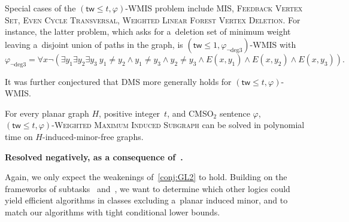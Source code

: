 \documentclass[a4paper,11pt]{article}
\newcommand{\cmsot}{\textsf{CMSO$_2$}\xspace}
\newcommand\tw{\mathsf{tw}}
\newcommand{\smis}{\textsc{MIS}\xspace}
\newtheorem{solved-conj}[conj]{Conjecture}
\newenvironment{solved-conjecture}[1][]
{
  \if\relax\detokenize{#1}\relax\begin{solved-conj}\else\begin{solved-conj}[#1]\fi
  \begin{mdframed}[style=solvedconjecturestyle]
}
{
  \end{mdframed}\end{solved-conj}
}
\begin{document}
Special cases of the $(\tw \leqslant t,\varphi)$-\textsc{WMIS} problem include \smis, \textsc{Feedback Vertex Set}, \textsc{Even Cycle Transversal}, \textsc{Weighted Linear Forest Vertex Deletion}. 
For instance, the latter problem, which asks for a~deletion set of minimum weight leaving a~disjoint union of paths in the graph, is $(\tw \leqslant 1,\varphi_{\neg \text{deg}3})$-\textsc{WMIS} with \[\varphi_{\neg \text{deg}3} = \forall x \neg \left(\exists y_1 \exists y_2 \exists y_3~y_1 \neq y_2 \land y_1 \neq y_3 \land y_2 \neq y_3 \land E(x,y_1) \land E(x,y_2) \land E(x,y_3)\right).\]

It was further conjectured that DMS more generally holds for $(\tw \leqslant t,\varphi)$-\textsc{WMIS}.

\begin{solved-conjecture}\label{conj:GL2}
  For every planar graph $H$, positive integer~$t$, and \cmsot sentence $\varphi$, $(\tw \leqslant t,\varphi)$-\textsc{Weighted Maximum Induced Subgraph} can be solved in polynomial time on $H$-induced-minor-free graphs.
\end{solved-conjecture}

\textbf{Resolved negatively, as a consequence of~\cite{BonnetC26}.}

\medskip

Again, we only expect the weakenings of~\cref{conj:GL2} to hold.
Building on the frameworks of subtasks~ and~, we want to determine which other logics could yield efficient algorithms in classes excluding a~planar induced minor, and to match our algorithms with tight conditional lower bounds.
\end{document}
